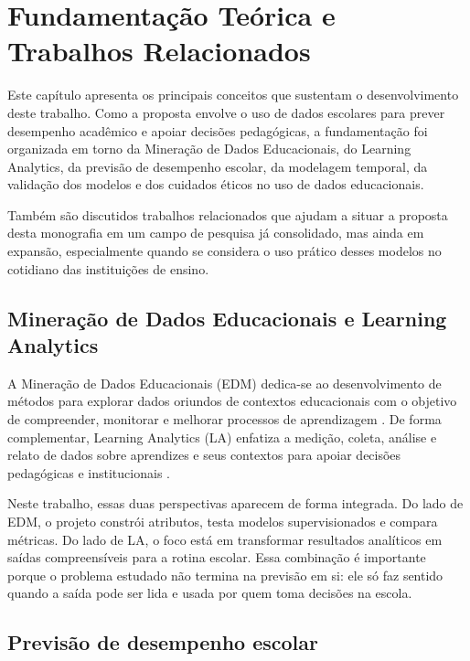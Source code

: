 \chapter{Fundamenta\c{c}\~ao Te\'orica e Trabalhos Relacionados}
\label{cap:referencial}

Este cap\'itulo apresenta os principais conceitos que sustentam o desenvolvimento deste trabalho. Como a proposta envolve o uso de dados escolares para prever desempenho acad\^emico e apoiar decis\~oes pedag\'ogicas, a fundamenta\c{c}\~ao foi organizada em torno da Minera\c{c}\~ao de Dados Educacionais, do Learning Analytics, da previs\~ao de desempenho escolar, da modelagem temporal, da valida\c{c}\~ao dos modelos e dos cuidados \'eticos no uso de dados educacionais.

Tamb\'em s\~ao discutidos trabalhos relacionados que ajudam a situar a proposta desta monografia em um campo de pesquisa j\'a consolidado, mas ainda em expans\~ao, especialmente quando se considera o uso pr\'atico desses modelos no cotidiano das institui\c{c}\~oes de ensino.

\section{Minera\c{c}\~ao de Dados Educacionais e Learning Analytics}
\label{sec:edm-la}

A Minera\c{c}\~ao de Dados Educacionais (EDM) dedica-se ao desenvolvimento de m\'etodos para explorar dados oriundos de contextos educacionais com o objetivo de compreender, monitorar e melhorar processos de aprendizagem \cite{romero2010,handbookedm}. De forma complementar, Learning Analytics (LA) enfatiza a medi\c{c}\~ao, coleta, an\'alise e relato de dados sobre aprendizes e seus contextos para apoiar decis\~oes pedag\'ogicas e institucionais \cite{siemens2012,baker2014}.

Neste trabalho, essas duas perspectivas aparecem de forma integrada. Do lado de EDM, o projeto constr\'oi atributos, testa modelos supervisionados e compara m\'etricas. Do lado de LA, o foco est\'a em transformar resultados anal\'iticos em sa\'idas compreens\'iveis para a rotina escolar. Essa combina\c{c}\~ao \'e importante porque o problema estudado n\~ao termina na previs\~ao em si: ele s\'o faz sentido quando a sa\'ida pode ser lida e usada por quem toma decis\~oes na escola.

\section{Previs\~ao de desempenho escolar}
\label{sec:previsao-desempenho}

